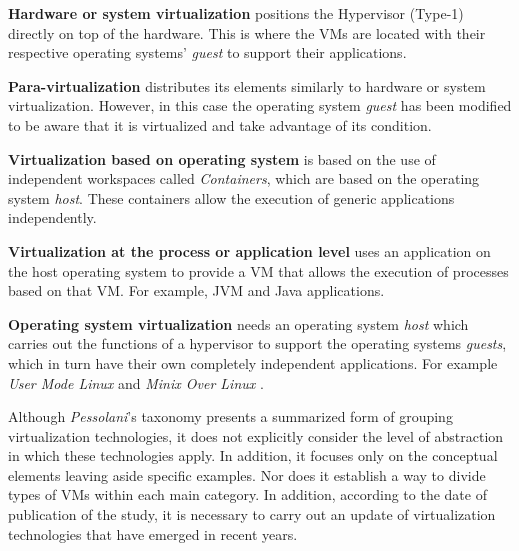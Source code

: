 		
		
	
		\textbf{Hardware or system virtualization} positions the Hypervisor (Type-1) directly on top of the hardware. This is where the VMs are located with their respective operating systems' \textit{guest} to support their applications.
		
		\textbf{Para-virtualization} distributes its elements similarly to hardware or system virtualization. However, in this case the operating system \textit{guest} has been modified to be aware that it is virtualized and take advantage of its condition.
		
		\textbf{Virtualization based on operating system} is based on the use of independent workspaces called \textit{Containers}, which are based on the operating system \textit{host}. These containers allow the execution of generic applications independently.
		
		\textbf {Virtualization at the process or application level} uses an application on the host operating system to provide a VM that allows the execution of processes based on that VM. For example, JVM and Java applications.
		
		\textbf {Operating system virtualization} needs an operating system \textit{host} which carries out the functions of a hypervisor to support the operating systems \textit{guests}, which in turn have their own completely independent applications. For example \textit{User Mode Linux} \cite{Dike2006} and \textit{Minix Over Linux} \cite{Pessolani2011}.

	
	Although \textit{Pessolani}'s  taxonomy presents a summarized form of grouping virtualization technologies, it does not  explicitly consider the level of abstraction in which these technologies apply. In addition, it focuses only on the conceptual elements leaving aside specific examples. Nor does it establish a way to divide types of VMs within each main category. In addition, according to the date of publication of the study, it is necessary to carry out an update of virtualization technologies that have emerged in recent years.